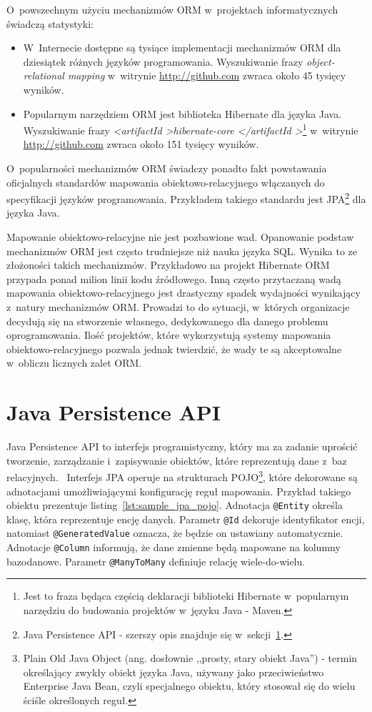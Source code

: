O~powszechnym użyciu mechanizmów ORM w~projektach informatycznych świadczą statystyki:

\begin{itemize}
	\item W~Internecie dostępne są tysiące implementacji mechanizmów ORM dla dziesiątek różnych języków programowania. Wyszukiwanie frazy \emph{object-relational mapping} w~witrynie \url{http://github.com} zwraca około 45 tysięcy wyników.
	\item Popularnym narzędziem ORM jest biblioteka Hibernate dla języka Java. Wyszukiwanie frazy \emph{\textless artifactId \textgreater hibernate-core \textless /artifactId \textgreater}\footnote{Jest to fraza będąca częścią deklaracji biblioteki Hibernate w~popularnym narzędziu do budowania projektów w~języku Java - Maven.} w~witrynie \url{http://github.com} zwraca około 151 tysięcy wyników.
\end{itemize}

O~popularności mechanizmów ORM świadczy ponadto fakt powstawania oficjalnych standardów mapowania obiektowo-relacyjnego włączanych do specyfikacji języków programowania. Przykładem takiego standardu jest JPA\footnote{Java Persistence API - szerszy opis znajduje się w~sekcji~\ref{sec:jpa}.} dla języka Java.

Mapowanie obiektowo-relacyjne nie jest pozbawione wad. Opanowanie podstaw mechanizmów ORM jest często trudniejsze niż nauka języka SQL. Wynika to ze złożoności takich mechanizmów. Przykładowo na projekt Hibernate ORM przypada ponad milion linii kodu źródłowego. Inną często przytaczaną wadą mapowania obiektowo-relacyjnego jest drastyczny spadek wydajności wynikający z~natury mechanizmów ORM. Prowadzi to do sytuacji, w~których organizacje decydują się na stworzenie własnego, dedykowanego dla danego problemu oprogramowania. Ilość projektów, które wykorzystują systemy mapowania obiektowo-relacyjnego pozwala jednak twierdzić, że wady te są akceptowalne w~obliczu licznych zalet ORM.

\section{Java Persistence API}
\label{sec:jpa}

Java Persistence API to interfejs programistyczny, który ma za zadanie uprościć tworzenie, zarządzanie i~zapisywanie obiektów, które reprezentują dane z~baz relacyjnych.~\cite{jpa_documentation} Interfejs JPA operuje na strukturach POJO\footnote{Plain Old Java Object (ang. dosłownie ,,prosty, stary obiekt Java'') - termin określający zwykły obiekt języka Java, używany jako przeciwieństwo Enterprise Java Bean, czyli specjalnego obiektu, który stosował się do wielu ściśle określonych reguł.}, które dekorowane są adnotacjami umożliwiającymi konfigurację reguł mapowania. Przykład takiego obiektu prezentuje listing~\ref{lst:sample_jpa_pojo}. Adnotacja \verb+@Entity+ określa klasę, która reprezentuje encję danych. Parametr \verb+@Id+ dekoruje identyfikator encji, natomiast \verb+@GeneratedValue+ oznacza, że będzie on ustawiany automatycznie. Adnotacje \verb+@Column+ informują, że dane zmienne będą mapowane na kolumny bazodanowe. Parametr \verb+@ManyToMany+ definiuje relację wiele-do-wielu. 

